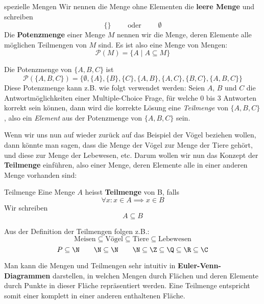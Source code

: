 \begin{definition}{spezielle Mengen}{}
Wir nennen die Menge ohne Elementen die \textbf{leere Menge} und schreiben
$$\{\} \qquad \text{ oder } \qquad \emptyset$$
Die \textbf{Potenzmenge} einer Menge $M$ nennen wir die Menge, deren Elemente alle möglichen Teilmengen von $M$ sind. Es ist also eine Menge von Mengen:
$$\mathcal{P}(M) = \{A \mid A \subseteq M\}$$
\end{definition}

\begin{example}[Potenzmenge]
Die Potenzmenge von $\{A,B,C\}$ ist
$$\mathcal{P}(\{A,B,C\}) = \{\emptyset, \{A\}, \{B\}, \{C\}, \{A, B\}, \{A, C\}, \{B, C\}, \{A, B, C\}\}$$
Diese Potenzmenge kann z.B. wie folgt verwendet werden: Seien $A$, $B$ und $C$ die Antwortmöglichkeiten einer Multiple-Choice Frage, für welche 0 bis 3 Antworten korrekt sein können, dann wird die korrekte Lösung eine \textit{Teilmenge} von $\{A,B,C\}$, also ein \textit{Element} aus der Potenzmenge von $\{A,B,C\}$ sein.
\end{example}

Wenn wir uns nun auf wieder zurück auf das Beispiel der Vögel beziehen wollen, dann könnte man sagen, dass die Menge der Vögel zur Menge der Tiere gehört, und diese zur Menge der Lebewesen, etc. Darum wollen wir nun das Konzept der \textbf{Teilmenge} einführen, also einer Menge, deren Elemente alle in einer anderen Menge vorhanden sind:
\begin{definition}{Teilmenge}{}
Eine Menge $A$ heisst \textbf{Teilmenge} von B, falls
$$\forall x : x \in A \implies x \in B$$
Wir schreiben
$$A \subseteq B$$
\end{definition}

\begin{example}[Teilmengen]
Aus der Definition der Teilmengen folgen z.B.:
$$\text{Meisen} \subseteq \text{Vögel} \subseteq \text{Tiere} \subseteq \text{Lebewesen}$$
$$P \subseteq \N \qquad \N \subseteq \N \qquad \N \subseteq \Z \subseteq \Q \subseteq \R \subseteq \C$$
\end{example}

Man kann die Mengen und Teilmengen sehr intuitiv in \textbf{Euler-Venn-Diagrammen} darstellen, in welchen Mengen durch Flächen und deren Elemente durch Punkte in dieser Fläche repräsentiert werden. Eine Teilmenge entspricht somit einer komplett in einer anderen enthaltenen Fläche.

